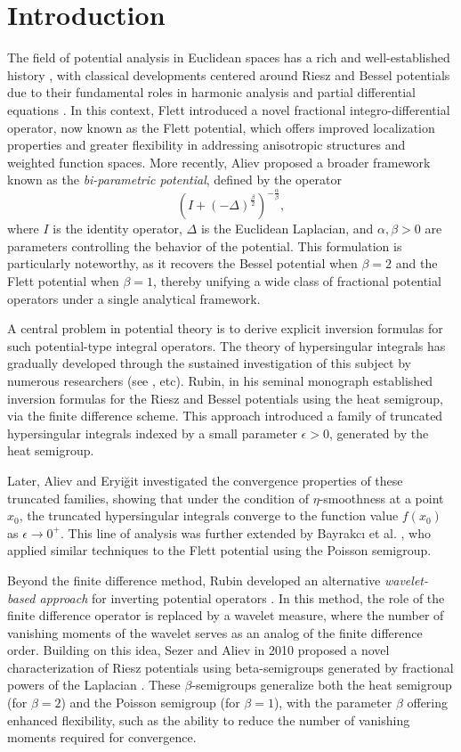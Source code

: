 \documentclass[11pt,a4paper,reqno]{amsproc}
\theoremstyle{definition}
\theoremstyle{remark}
\numberwithin{equation}{section}
\begin{document}
\section{Introduction}
The field of potential analysis in Euclidean spaces has a rich and well-established history \cite{Stein}, with classical developments centered around Riesz and Bessel potentials due to their fundamental roles in harmonic analysis and partial differential equations \cite{Aronszajn}. In this context, Flett \cite{Flett} introduced a novel fractional integro-differential operator, now known as the Flett potential, which offers improved localization properties and greater flexibility in addressing anisotropic structures and weighted function spaces. More recently, Aliev \cite{Aliev} proposed a broader framework known as the \emph{bi-parametric potential}, defined by the operator
\[
\left(I + (-\Delta)^{\frac{\beta}{2}}\right)^{-\frac{\alpha}{\beta}},
\]
where $I$ is the identity operator, $\Delta$ is the Euclidean Laplacian, and $\alpha, \beta > 0$ are parameters controlling the behavior of the potential. This formulation is particularly noteworthy, as it recovers the Bessel potential when $\beta = 2$ and the Flett potential when $\beta = 1$, thereby unifying a wide class of fractional potential operators under a single analytical framework.

A central problem in potential theory is to derive explicit inversion formulas for such potential-type integral operators. The theory of hypersingular integrals has gradually developed through the sustained investigation of this subject by numerous researchers (see \cite{Bagby,  Lizorkin, Stein}, etc). Rubin, in his seminal monograph
 \cite{Rubin-1986} established inversion formulas for the Riesz and Bessel potentials using the heat semigroup, via the finite difference scheme. This approach introduced a family of truncated hypersingular integrals indexed by a small parameter $\epsilon > 0$, generated by the heat semigroup.

Later, Aliev and Eryiğit \cite{Aliev-2013} investigated the convergence properties of these truncated families, showing that under the condition of $\eta$-smoothness at a point $x_0$, the truncated hypersingular integrals converge to the function value $f(x_0)$ as $\epsilon \to 0^+$. This line of analysis was further extended by Bayrakcı et al. \cite{Bayrakci}, who applied similar techniques to the Flett potential using the Poisson semigroup.

Beyond the finite difference method, Rubin developed an alternative \emph{wavelet-based approach} for inverting potential operators \cite{Rubin-1996, Rubin-1998}. In this method, the role of the finite difference operator is replaced by a wavelet measure, where the number of vanishing moments of the wavelet serves as an analog of the finite difference order. Building on this idea, Sezer and Aliev in 2010  proposed a novel characterization of Riesz potentials using beta-semigroups generated by fractional powers of the Laplacian \cite{Sezer}. These $\beta$-semigroups generalize both the heat semigroup (for $\beta = 2$) and the Poisson semigroup (for $\beta = 1$), with the parameter $\beta$ offering enhanced flexibility, such as the ability to reduce the number of vanishing moments required for convergence.
\end{document}
